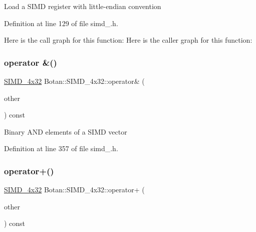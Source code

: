 Load a S\+I\+MD register with little-\/endian convention 

Definition at line 129 of file simd\+\_.\+h.

Here is the call graph for this function\+:
Here is the caller graph for this function\+:
\mbox{\label{class_botan_1_1_s_i_m_d__4x32_ac6a07777190e0fdb9fb9147e63d8e57a}} 
\subsubsection{\texorpdfstring{operator \&()}{operator \&()}}
{\footnotesize\ttfamily \mbox{\hyperlink{class_botan_1_1_s_i_m_d__4x32}{S\+I\+M\+D\+\_\+4x32}} Botan\+::\+S\+I\+M\+D\+\_\+4x32\+::operator\& (\begin{DoxyParamCaption}\item[{const \mbox{\hyperlink{class_botan_1_1_s_i_m_d__4x32}{S\+I\+M\+D\+\_\+4x32}} \&}]{other }\end{DoxyParamCaption}) const\hspace{0.3cm}{\ttfamily [inline]}}

Binary A\+ND elements of a S\+I\+MD vector 

Definition at line 357 of file simd\+\_.\+h.

\mbox{\label{class_botan_1_1_s_i_m_d__4x32_ae2ff2ca95e5b6a17ee128888ca047235}} 
\subsubsection{\texorpdfstring{operator+()}{operator+()}}
{\footnotesize\ttfamily \mbox{\hyperlink{class_botan_1_1_s_i_m_d__4x32}{S\+I\+M\+D\+\_\+4x32}} Botan\+::\+S\+I\+M\+D\+\_\+4x32\+::operator+ (\begin{DoxyParamCaption}\item[{const \mbox{\hyperlink{class_botan_1_1_s_i_m_d__4x32}{S\+I\+M\+D\+\_\+4x32}} \&}]{other }\end{DoxyParamCaption}) const\hspace{0.3cm}{\ttfamily [inline]}}

